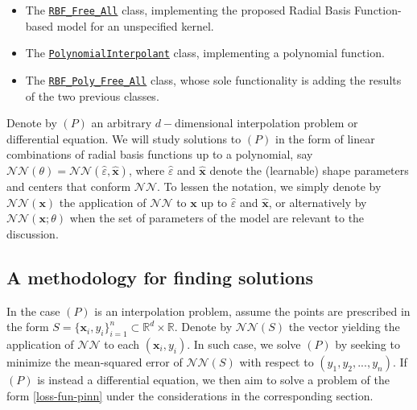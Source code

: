 \documentclass[12pt]{report} %
\newcommand{\tmmathbf}[1]{\ensuremath{\boldsymbol{#1}}}
\begin{document}
\begin{itemize}
  \item The \href{https://github.com/heqro/tfm-experiments/blob/4fd010c560a247b00def20dd94d1f984d7992a24/modules/nn_rbf.py\#L6}{\texttt{RBF\_Free\_All}} class, implementing the proposed Radial Basis Function-based model for an unspecified kernel.
  \item The \href{https://github.com/heqro/tfm-experiments/blob/4fd010c560a247b00def20dd94d1f984d7992a24/modules/nn_poly.py#L6}{\texttt{PolynomialInterpolant}} class, implementing a polynomial function.
  \item The \href{https://github.com/heqro/tfm-experiments/blob/4fd010c560a247b00def20dd94d1f984d7992a24/modules/nn_rbf_poly.py#L8}{\texttt{RBF\_Poly\_Free\_All}} class, whose sole functionality is adding the results of the two previous classes.
\end{itemize}

Denote by $(P)$  an arbitrary $d-$dimensional interpolation problem or differential equation. We will study solutions to $(P)$ in the form of linear combinations of radial basis functions up to a polynomial, say $\mathcal{NN}(\theta) = \mathcal{NN}(\hat{\varepsilon}, \hat{\tmmathbf{x}})$, where $\hat{\varepsilon}$ and $\hat{\tmmathbf{x}}$ denote the (learnable) shape parameters and centers that conform $\mathcal{NN}$. To lessen the notation, we simply denote by $\mathcal{NN}(\tmmathbf{x})$ the application of $\mathcal{NN}$ to $\tmmathbf{x}$ up to $\hat{\varepsilon}$ and $\hat{\tmmathbf{x}}$, or alternatively by $\mathcal{NN}(\tmmathbf{x};\theta)$ when the set of parameters of the model are relevant to the discussion.

\subsection{A methodology for finding solutions}

In the case $(P)$ is an interpolation problem, assume the points are prescribed in the form $S = \{\tmmathbf{x}_i, y_i\}_{i=1}^n \subset \mathbb{R}^d \times \mathbb{R}$. Denote by $\mathcal{NN}(S)$ the vector yielding the application of $\mathcal{NN}$ to each $(\tmmathbf{x}_i, y_i)$. In such case, we solve $(P)$ by seeking to minimize the mean-squared error of $\mathcal{NN}(S)$ with respect to $(y_1, y_2, ..., y_n)$. If $(P)$ is instead a differential equation, we then aim to solve a problem of the form \eqref{loss-fun-pinn} under the considerations in the corresponding section. 
\end{document}
